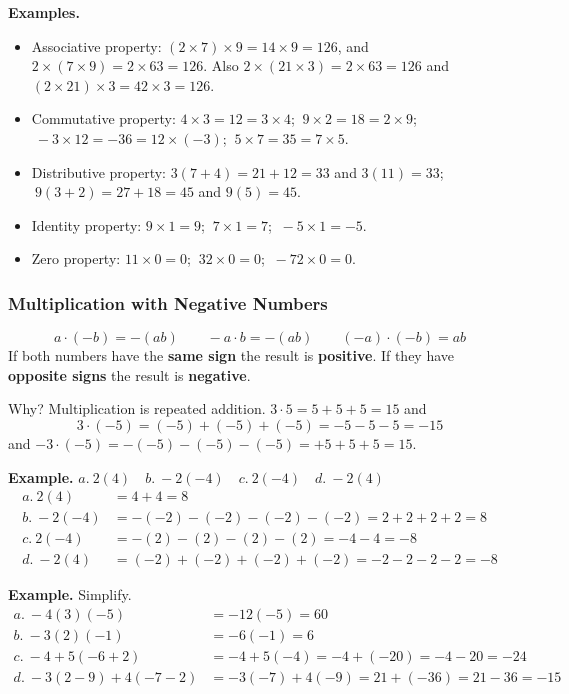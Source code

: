 \documentclass[letter]{article}
\newenvironment{keybox}
  {\begin{lrbox}{\keyboxsave}\begin{minipage}{\dimexpr\linewidth-2\fboxsep-2\fboxrule\relax}}
  {\end{minipage}\end{lrbox}\par\noindent\fbox{\usebox{\keyboxsave}}\par}
\begin{document}
\textbf{Examples.}
\begin{itemize}[itemsep=2pt]
  \item Associative property: $(2\times7)\times9=14\times9=126$, and $2\times(7\times9)=2\times63=126$. Also $2\times(21\times3)=2\times63=126$ and $(2\times21)\times3=42\times3=126$.
  \item Commutative property: $4\times3=12=3\times4$; $\ 9\times2=18=2\times9$; $\ -3\times12=-36=12\times(-3)$; $\ 5\times7=35=7\times5$.
  \item Distributive property: $3(7+4)=21+12=33$ and $3(11)=33$; $\ 9(3+2)=27+18=45$ and $9(5)=45$.
  \item Identity property: $9\times1=9$; $\ 7\times1=7$; $\ -5\times1=-5$.
  \item Zero property: $11\times0=0$; $\ 32\times0=0$; $\ -72\times0=0$.
\end{itemize}

\subsubsection*{Multiplication with Negative Numbers}

\begin{keybox}
\[a\cdot(-b)=-(ab)\qquad-a\cdot b=-(ab)\qquad(-a)\cdot(-b)=ab\]
If both numbers have the \textbf{same sign} the result is \textbf{positive}. If they have \textbf{opposite signs} the result is \textbf{negative}.
\end{keybox}

Why? Multiplication is repeated addition. $3\cdot5=5+5+5=15$ and
\[3\cdot(-5)=(-5)+(-5)+(-5)=-5-5-5=-15\]
and $-3\cdot(-5)=-(-5)-(-5)-(-5)=+5+5+5=15$.

\textbf{Example.} $a.\ 2(4)\quad b.\ -2(-4)\quad c.\ 2(-4)\quad d.\ -2(4)$
\begin{align*}
  a.\ 2(4)&=4+4=8\\
  b.\ -2(-4)&=-(-2)-(-2)-(-2)-(-2)=2+2+2+2=8\\
  c.\ 2(-4)&=-(2)-(2)-(2)-(2)=-4-4=-8\\
  d.\ -2(4)&=(-2)+(-2)+(-2)+(-2)=-2-2-2-2=-8
\end{align*}

\textbf{Example.} Simplify.
\begin{align*}
  a.\ -4(3)(-5)&=-12(-5)=60\\
  b.\ -3(2)(-1)&=-6(-1)=6\\
  c.\ -4+5(-6+2)&=-4+5(-4)=-4+(-20)=-4-20=-24\\
  d.\ -3(2-9)+4(-7-2)&=-3(-7)+4(-9)=21+(-36)=21-36=-15
\end{align*}
\end{document}
